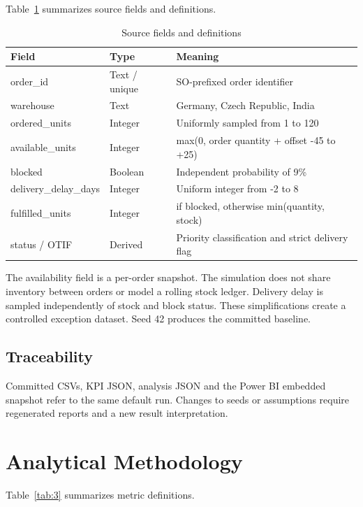 \documentclass[conference,letterpaper]{IEEEtran}
\begin{document}
Table~\ref{tab:2} summarizes source fields and definitions.

\begin{table}[H]
\caption{Source fields and definitions}\label{tab:2}
\centering\footnotesize
\setlength{\tabcolsep}{3pt}
\begin{tabularx}{\columnwidth}{>{\raggedright\arraybackslash}X >{\raggedright\arraybackslash}X >{\raggedright\arraybackslash}X}
\hline
\textbf{Field} & \textbf{Type} & \textbf{Meaning} \\
\hline
order\_id & Text / unique & SO-prefixed order identifier \\
warehouse & Text & Germany, Czech Republic, India \\
ordered\_units & Integer & Uniformly sampled from 1 to 120 \\
available\_units & Integer & max(0, order quantity + offset -45 to +25) \\
blocked & Boolean & Independent probability of 9\% \\
delivery\_delay\_days & Integer & Uniform integer from -2 to 8 \\
fulfilled\_units & Integer & 0 if blocked, otherwise min(quantity, stock) \\
status / OTIF & Derived & Priority classification and strict delivery flag \\
\hline
\end{tabularx}
\end{table}

The availability field is a per-order snapshot. The simulation does not share inventory between orders or model a rolling stock ledger. Delivery delay is sampled independently of stock and block status. These simplifications create a controlled exception dataset. Seed 42 produces the committed baseline.


\subsection{Traceability}

Committed CSVs, KPI JSON, analysis JSON and the Power BI embedded snapshot refer to the same default run. Changes to seeds or assumptions require regenerated reports and a new result interpretation.


\section{Analytical Methodology}

Table~\ref{tab:3} summarizes metric definitions.
\end{document}
